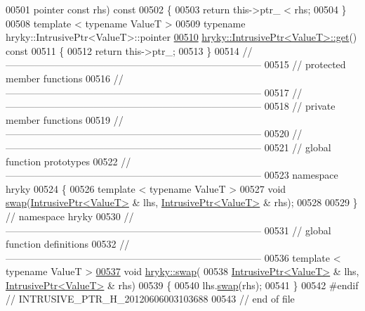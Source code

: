 \begin{DoxyCode}
00501     pointer \textcolor{keyword}{const} rhs)\textcolor{keyword}{ const}
00502 \textcolor{keyword}{}\{
00503     \textcolor{keywordflow}{return} this->ptr\_ < rhs;
00504 \}
00508 \textcolor{keyword}{template} < \textcolor{keyword}{typename} ValueT >
00509 \textcolor{keyword}{typename} hryky::IntrusivePtr<ValueT>::pointer
\hypertarget{intrusive__ptr_8h_source_l00510}{}\hyperlink{classhryky_1_1_intrusive_ptr_a876dbe10311099aba912f8cfa3fd635b}{00510} \hyperlink{namespacehryky_1_1log_1_1writer_a67d38d407be7aaf3cc9ed3ac8e3b2835}{hryky::IntrusivePtr<ValueT>::get}()\textcolor{keyword}{ const}
00511 \textcolor{keyword}{}\{
00512     \textcolor{keywordflow}{return} this->ptr\_;
00513 \}
00514 \textcolor{comment}{//
      ------------------------------------------------------------------------------}
00515 \textcolor{comment}{// protected member functions}
00516 \textcolor{comment}{//
      ------------------------------------------------------------------------------}
00517 \textcolor{comment}{//
      ------------------------------------------------------------------------------}
00518 \textcolor{comment}{// private member functions}
00519 \textcolor{comment}{//
      ------------------------------------------------------------------------------}
00520 \textcolor{comment}{//
      ------------------------------------------------------------------------------}
00521 \textcolor{comment}{// global function prototypes}
00522 \textcolor{comment}{//
      ------------------------------------------------------------------------------}
00523 \textcolor{keyword}{namespace }hryky
00524 \{
00526     \textcolor{keyword}{template} < \textcolor{keyword}{typename} ValueT >
00527     \textcolor{keywordtype}{void} \hyperlink{namespacehryky_a4282146df5ea2b68cb667896a2205909}{swap}(\hyperlink{classhryky_1_1_intrusive_ptr}{IntrusivePtr<ValueT>} & lhs, \hyperlink{classhryky_1_1_intrusive_ptr}{IntrusivePtr<ValueT>} & rhs);
00528 
00529 \} \textcolor{comment}{// namespace hryky}
00530 \textcolor{comment}{//
      ------------------------------------------------------------------------------}
00531 \textcolor{comment}{// global function definitions}
00532 \textcolor{comment}{//
      ------------------------------------------------------------------------------}
00536 \textcolor{comment}{}\textcolor{keyword}{template} < \textcolor{keyword}{typename} ValueT >
\hypertarget{intrusive__ptr_8h_source_l00537}{}\hyperlink{namespacehryky_a25ffda8718a68348345dae8a0b651e17}{00537} \textcolor{keywordtype}{void} \hyperlink{namespacehryky_a4282146df5ea2b68cb667896a2205909}{hryky::swap}(
00538     \hyperlink{classhryky_1_1_intrusive_ptr}{IntrusivePtr<ValueT>} & lhs, \hyperlink{classhryky_1_1_intrusive_ptr}{IntrusivePtr<ValueT>} & rhs)
00539 \{
00540     lhs.\hyperlink{classhryky_1_1_intrusive_ptr_ab60b6a55a688776b82510c08c614709c}{swap}(rhs);
00541 \}
00542 \textcolor{preprocessor}{#endif // INTRUSIVE\_PTR\_H\_20120606003103688}
00543 \textcolor{preprocessor}{}\textcolor{comment}{// end of file}
\end{DoxyCode}
